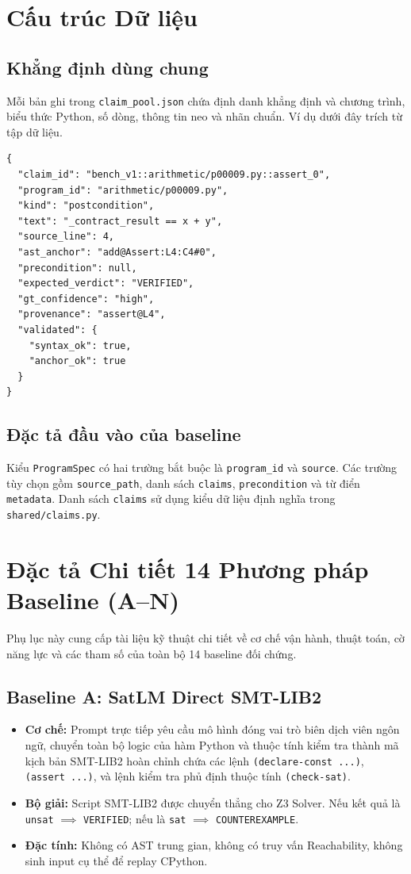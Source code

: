 \chapter{Cấu trúc Dữ liệu}
\label{app:data_schemas}

\section{Khẳng định dùng chung}
Mỗi bản ghi trong \texttt{claim\_pool.json} chứa định danh khẳng định và chương trình, biểu thức Python, số dòng, thông tin neo và nhãn chuẩn. Ví dụ dưới đây trích từ tập dữ liệu.
\begin{lstlisting}[caption={Một bản ghi trong tập khẳng định dùng chung}]
{
  "claim_id": "bench_v1::arithmetic/p00009.py::assert_0",
  "program_id": "arithmetic/p00009.py",
  "kind": "postcondition",
  "text": "_contract_result == x + y",
  "source_line": 4,
  "ast_anchor": "add@Assert:L4:C4#0",
  "precondition": null,
  "expected_verdict": "VERIFIED",
  "gt_confidence": "high",
  "provenance": "assert@L4",
  "validated": {
    "syntax_ok": true,
    "anchor_ok": true
  }
}
\end{lstlisting}

\section{Đặc tả đầu vào của baseline}
Kiểu \texttt{ProgramSpec} có hai trường bắt buộc là \texttt{program\_id} và \texttt{source}. Các trường tùy chọn gồm \texttt{source\_path}, danh sách \texttt{claims}, \texttt{precondition} và từ điển \texttt{metadata}. Danh sách \texttt{claims} sử dụng kiểu dữ liệu định nghĩa trong \texttt{shared/claims.py}.

\chapter{Đặc tả Chi tiết 14 Phương pháp Baseline (A--N)}
\label{app:baselines_specification}

Phụ lục này cung cấp tài liệu kỹ thuật chi tiết về cơ chế vận hành, thuật toán, cờ năng lực và các tham số của toàn bộ 14 baseline đối chứng.

\section{Baseline A: SatLM Direct SMT-LIB2}
\begin{itemize}
    \item \textbf{Cơ chế:} Prompt trực tiếp yêu cầu mô hình đóng vai trò biên dịch viên ngôn ngữ, chuyển toàn bộ logic của hàm Python và thuộc tính kiểm tra thành mã kịch bản SMT-LIB2 hoàn chỉnh chứa các lệnh \texttt{(declare-const ...)}, \texttt{(assert ...)}, và lệnh kiểm tra phủ định thuộc tính \texttt{(check-sat)}.
    \item \textbf{Bộ giải:} Script SMT-LIB2 được chuyển thẳng cho Z3 Solver. Nếu kết quả là \texttt{unsat} $\implies$ \texttt{VERIFIED}; nếu là \texttt{sat} $\implies$ \texttt{COUNTEREXAMPLE}.
    \item \textbf{Đặc tính:} Không có AST trung gian, không có truy vấn Reachability, không sinh input cụ thể để replay CPython.
\end{itemize}

